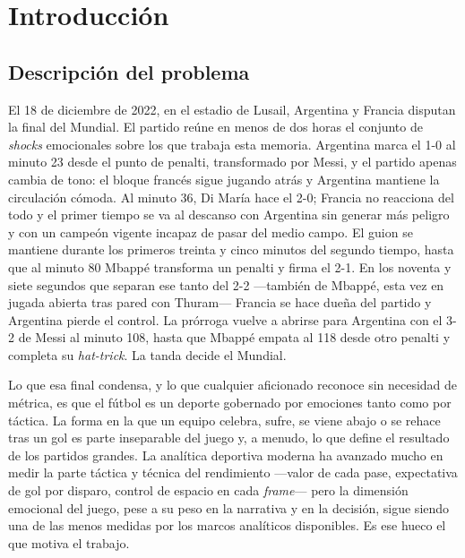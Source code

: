 \chapter{Introducción}
\label{ch:introduccion}

\section{Descripción del problema}
\label{sec:problema}

El 18 de diciembre de 2022, en el estadio de Lusail, Argentina y Francia
disputan la final del Mundial. El partido reúne en menos de dos horas el
conjunto de \textit{shocks} emocionales sobre los que trabaja esta
memoria. Argentina marca el 1-0 al minuto 23 desde el punto de penalti,
transformado por Messi, y el partido apenas cambia de tono: el bloque
francés sigue jugando atrás y Argentina mantiene la circulación cómoda.
Al minuto 36, Di María hace el 2-0; Francia no reacciona del todo y el
primer tiempo se va al descanso con Argentina sin generar más peligro y
con un campeón vigente incapaz de pasar del medio campo. El guion se
mantiene durante los primeros treinta y cinco minutos del segundo
tiempo, hasta que al minuto 80 Mbappé transforma un penalti y firma el
2-1. En los noventa y siete segundos que separan ese tanto del 2-2
---también de Mbappé, esta vez en jugada abierta tras pared con
Thuram--- Francia se hace dueña del partido y Argentina pierde el
control. La prórroga vuelve a abrirse para Argentina con el 3-2 de Messi
al minuto 108, hasta que Mbappé empata al 118 desde otro penalti y
completa su \emph{hat-trick}. La tanda decide el Mundial.

Lo que esa final condensa, y lo que cualquier aficionado reconoce sin
necesidad de métrica, es que el fútbol es un deporte gobernado por
emociones tanto como por táctica. La forma en la que un equipo
celebra, sufre, se viene abajo o se rehace tras un gol es parte
inseparable del juego y, a menudo, lo que define el resultado de los
partidos grandes. La analítica deportiva moderna ha avanzado mucho en
medir la parte táctica y técnica del rendimiento ---valor de cada
pase, expectativa de gol por disparo, control de espacio en cada
\textit{frame}--- pero la dimensión emocional del juego, pese a su
peso en la narrativa y en la decisión, sigue siendo una de las menos
medidas por los marcos analíticos disponibles. Es ese hueco el que
motiva el trabajo.

